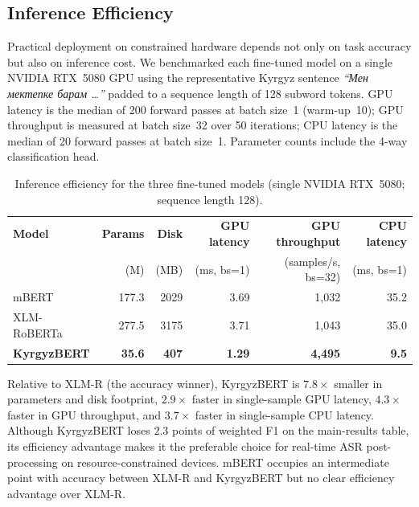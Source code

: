 \documentclass[manuscript, review]{acmart}
\begin{document}
\subsection{Inference Efficiency}
\label{sec:inference-efficiency}

Practical deployment on constrained hardware depends not only on task accuracy but also on inference cost. We benchmarked each fine-tuned model on a single NVIDIA RTX~5080 GPU using the representative Kyrgyz sentence \emph{``Мен мектепке барам \ldots''} padded to a sequence length of 128 subword tokens. GPU latency is the median of 200 forward passes at batch size~1 (warm-up~10); GPU throughput is measured at batch size~32 over 50 iterations; CPU latency is the median of 20 forward passes at batch size~1. Parameter counts include the 4-way classification head.

\begin{table}[t]
\centering
\small
\caption{Inference efficiency for the three fine-tuned models (single NVIDIA RTX~5080; sequence length 128).}
\label{tab:efficiency}
\begin{tabular}{lrrrrr}
\toprule
\textbf{Model} & \textbf{Params} & \textbf{Disk} & \textbf{GPU latency} & \textbf{GPU throughput} & \textbf{CPU latency} \\
               & (M)             & (MB)          & (ms, bs=1)           & (samples/s, bs=32)      & (ms, bs=1) \\
\midrule
mBERT          & 177.3 & 2029 & 3.69 & 1{,}032 & 35.2 \\
XLM-RoBERTa    & 277.5 & 3175 & 3.71 & 1{,}043 & 35.0 \\
\textbf{KyrgyzBERT} & \textbf{35.6} & \textbf{407} & \textbf{1.29} & \textbf{4{,}495} & \textbf{9.5} \\
\bottomrule
\end{tabular}
\end{table}

Relative to XLM-R (the accuracy winner), KyrgyzBERT is $7.8\times$ smaller in parameters and disk footprint, $2.9\times$ faster in single-sample GPU latency, $4.3\times$ faster in GPU throughput, and $3.7\times$ faster in single-sample CPU latency. Although KyrgyzBERT loses $2.3$ points of weighted F1 on the main-results table, its efficiency advantage makes it the preferable choice for real-time ASR post-processing on resource-constrained devices. mBERT occupies an intermediate point with accuracy between XLM-R and KyrgyzBERT but no clear efficiency advantage over XLM-R.
\end{document}
